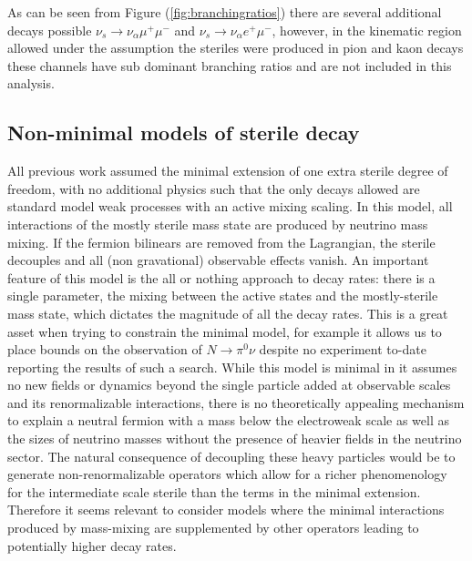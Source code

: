 \documentclass[11pt, a4paper]{article}
\begin{document}
As can be seen from Figure (\ref{fig:branchingratios}) there are several additional decays possible $\nu_s \rightarrow \nu_\alpha \mu^+ \mu^-$ and $\nu_s \rightarrow \nu_\alpha e^+ \mu^-$, however, in the kinematic region allowed under the assumption the steriles were produced in pion and kaon decays these channels have sub dominant branching ratios and are not included in this analysis.

\subsection{Non-minimal models of sterile decay}

All previous work assumed the minimal extension of one extra sterile degree of
freedom, with no additional physics such that the only decays allowed are
standard model weak processes with an active mixing scaling. 
%
In this model, all interactions of the mostly sterile mass state are produced
by neutrino mass mixing. If the fermion bilinears are removed from the
Lagrangian, the sterile decouples and all (non gravational) observable effects
vanish. An important feature of this model is the all or nothing approach to
decay rates: there is a single parameter, the mixing between the active states
and the mostly-sterile mass state, which dictates the magnitude of all the
decay rates. This is a great asset when trying to constrain the  minimal model,
for example it allows us to place bounds on the observation of $N\to \pi^0 \nu$
despite no experiment to-date reporting the results of such a search. 
%
While this model is minimal in it assumes no new fields or dynamics beyond the
single particle added at observable scales and its renormalizable interactions,
there is no theoretically appealing mechanism to explain a neutral fermion with
a mass below the electroweak scale as well as the sizes of neutrino masses
without the presence of heavier fields in the neutrino sector. The natural
consequence of decoupling these heavy particles would be to generate
non-renormalizable operators which allow for a richer phenomenology for the
intermediate scale sterile than the terms in the minimal extension. Therefore it 
seems relevant to consider models where the minimal interactions produced by 
mass-mixing are supplemented by other operators leading to potentially 
higher decay rates.
\end{document}
